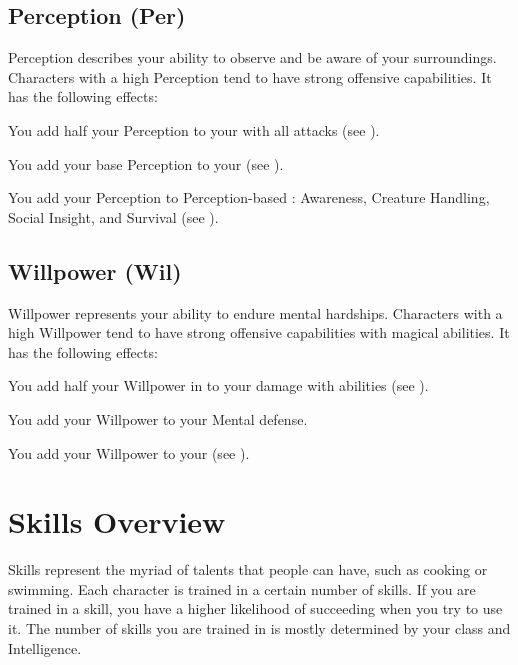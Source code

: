     \subsection{Perception (Per)}\label{Perception}
        {
            Perception describes your ability to observe and be aware of your surroundings.
            Characters with a high Perception tend to have strong offensive capabilities.
            It has the following effects:
            \begin{raggeditemize}
                \item You add half your Perception to your  with all attacks (see ).
                \item You add your base Perception to your  (see ).
                \item You add your Perception to Perception-based : Awareness, Creature Handling, Social Insight, and Survival (see ).
            \end{raggeditemize}
        }

    \subsection{Willpower (Wil)}\label{Willpower}
        {
            Willpower represents your ability to endure mental hardships.
            Characters with a high Willpower tend to have strong offensive capabilities with magical abilities.
            It has the following effects:
            \begin{raggeditemize}
                \item You add half your Willpower in  to your damage with  abilities (see ).
                \item You add your Willpower to your Mental defense.
                \item You add your Willpower to your  (see ).
            \end{raggeditemize}
        }

\section{Skills Overview}
    Skills represent the myriad of talents that people can have, such as cooking or swimming.
    Each character is trained in a certain number of skills.
    If you are trained in a skill, you have a higher likelihood of succeeding when you try to use it.
    The number of skills you are trained in is mostly determined by your class and Intelligence.

